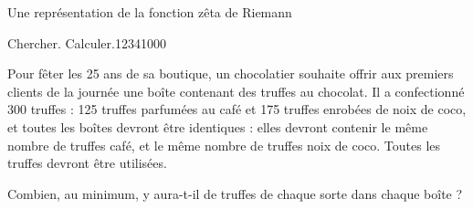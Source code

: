 {\begin{His}
\begin{minipage}[b]{0.4\textwidth}
\begin{center}
  Une représentation de la fonction zêta de Riemann

\end{center}
\end{minipage}

\end{His}

 

\begin{ExoDec}{Chercher. Calculer.}{1234}{1}{0}{0}{0}

Pour fêter les 25 ans de sa boutique, un chocolatier souhaite offrir aux premiers clients de la journée une boîte contenant des truffes au chocolat.
Il a confectionné 300 truffes : 125 truffes parfumées au café et 175 truffes enrobées de noix de coco, et toutes les boîtes devront être identiques : elles
devront contenir le même nombre de truffes café, et le même nombre
de truffes noix de coco. Toutes les truffes devront être utilisées.

Combien, au minimum,  y aura-t-il de truffes de chaque sorte dans chaque boîte ?
 
\end{ExoDec}



}

